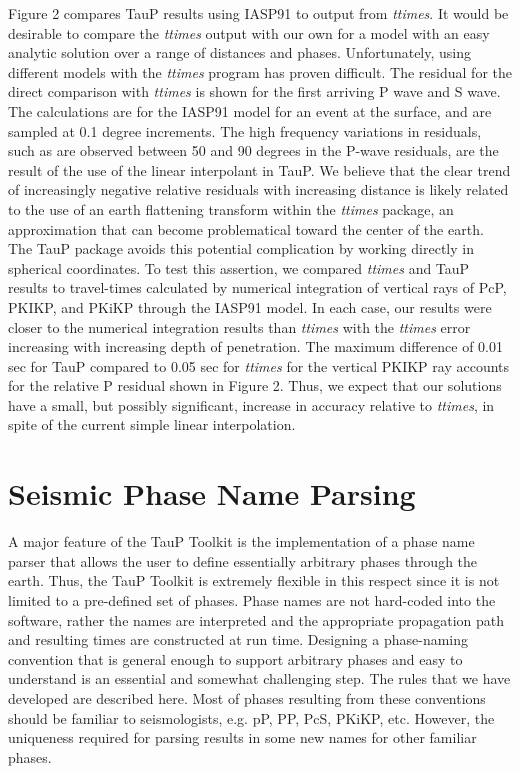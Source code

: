Figure 2 compares TauP results using IASP91 to output from \textit{ttimes}.
It would be desirable to compare the \textit{ttimes} output with our own
for a model with an easy analytic solution over a range of distances and
phases. 
Unfortunately, using different models with the \textit{ttimes}
program has proven difficult.
The residual for the direct comparison with \textit{ttimes} is shown for
the first arriving P wave and S wave. 
The calculations are for the IASP91 model for an
event at the surface, and are sampled at 0.1 degree increments. 
The high frequency variations in residuals, such as are observed between 50 and 90 degrees
in the P-wave residuals, are the result of the use of the linear interpolant in TauP.
We believe that the clear trend of increasingly negative relative residuals 
with increasing distance is likely related to the use of an 
earth flattening transform within the \textit{ttimes} package, an approximation that can
become problematical toward the center of the earth.
The TauP package avoids this potential complication by working directly in spherical coordinates.
To test this assertion, we compared \textit{ttimes} and TauP results to travel-times
calculated by numerical integration of vertical rays of PcP, PKIKP, and PKiKP through the
IASP91 model.
In each case, our results were closer to the numerical integration results than \textit{ttimes} with
the \textit{ttimes} error increasing with increasing depth of penetration. 
The maximum difference of 0.01 sec for TauP compared to 0.05 sec for \textit{ttimes} for the
vertical PKIKP ray accounts for the relative P residual shown in Figure 2.
Thus, we expect that our solutions have a small, but possibly significant, increase in 
accuracy relative to \textit{ttimes}, in spite of the current simple linear interpolation.

\section*{Seismic Phase Name Parsing}

A major feature of the TauP Toolkit is the implementation of a phase name parser
that allows the user to define essentially arbitrary phases through the earth.
Thus, the TauP Toolkit is extremely flexible in this respect since it is
not limited to a pre-defined set of phases.  
Phase names are not hard-coded into the software, rather the names are interpreted
and the appropriate propagation path and resulting times are constructed at run time.
Designing a phase-naming convention that is general enough to support arbitrary phases
and easy to understand is an essential and somewhat challenging step.
The rules that we have developed are described here.
Most of phases resulting from these conventions should 
be familiar to seismologists, e.g. pP, PP, PcS, PKiKP, etc. 
However, the uniqueness required for parsing results in some new names for other
familiar phases.


